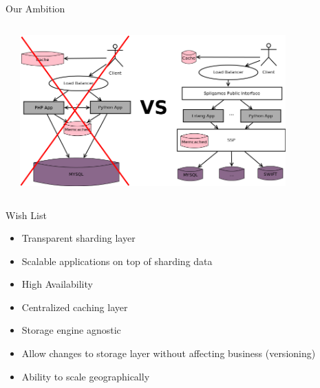 \documentclass[aspectratio=169]{beamer}
\begin{document}
\begin{frame}{Our Ambition}
    \begin{columns}
        \begin{column}[c]{0.1\textwidth}
        \end{column}
        \begin{column}[c]{0.9\textwidth}
            \includegraphics[width=0.8\textwidth]{images/storageusage.png}
        \end{column}
    \end{columns}
\end{frame}

\begin{frame}{Wish List}
    \begin{itemize}
        \item Transparent sharding layer
        \item Scalable applications on top of sharding data
        \item High Availability
        \item Centralized caching layer
        \item Storage engine agnostic
        \item Allow changes to storage layer without affecting business (versioning)
        \item Ability to scale geographically
    \end{itemize}
\end{frame}
\end{document}
